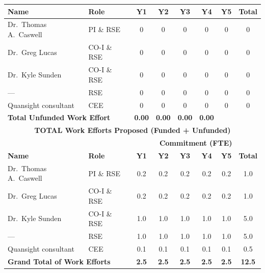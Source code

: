 \documentclass[12pt]{article}
\numberwithin{page}{section}
\begin{document}
\begin{tabular}{|l|l|c|c|c|c|c|c|}
  \cellcolor{gray!30}\textbf{Name }& \cellcolor{gray!30}\textbf{Role} & \cellcolor{gray!30}\textbf{Y1} & \cellcolor{gray!30}\textbf{Y2} & \cellcolor{gray!30}\textbf{Y3}& \cellcolor{gray!30}\textbf{Y4}& \cellcolor{gray!30}\textbf{Y5} & \cellcolor{gray!30}\textbf{Total}     \\  \hline
  Dr.\ Thomas A.\ Caswell & PI \& RSE   & 0 & 0 & 0 & 0 & 0 & 0 \\  \hline
  Dr.\ Greg Lucas         & CO-I \& RSE & 0 & 0 & 0 & 0 & 0 & 0 \\  \hline
  Dr.\ Kyle Sunden        & CO-I \& RSE & 0 & 0 & 0 & 0 & 0 & 0 \\  \hline
  ---                     & RSE         & 0 & 0 & 0 & 0 & 0 & 0 \\  \hline
  Quansight consultant    & CEE         & 0 & 0 & 0 & 0 & 0 & 0 \\  \hline
  \multicolumn{2}{|l|}{\textbf{Total Unfunded Work Effort}} & \textbf{0.00} & \textbf{0.00} & \textbf{0.00}& \textbf{0.00}\\\hline
  \multicolumn{8}{|c|}{\cellcolor{gray!30}\textbf{TOTAL Work Efforts Proposed (Funded + Unfunded)}}\\  \hline
  \cellcolor{gray!30} &  \cellcolor{gray!30}&\multicolumn{6}{c|}{\cellcolor{gray!30}\textbf{Commitment (FTE)}} \\
  \hhline{|*2{>{\arrayrulecolor{gray!30}}-}*4{>{\arrayrulecolor{black}}-}|}
  \cellcolor{gray!30}\textbf{Name }& \cellcolor{gray!30}\textbf{Role} & \cellcolor{gray!30}\textbf{Y1} & \cellcolor{gray!30}\textbf{Y2} & \cellcolor{gray!30}\textbf{Y3}& \cellcolor{gray!30}\textbf{Y4}& \cellcolor{gray!30}\textbf{Y5} & \cellcolor{gray!30}\textbf{Total}     \\  \hline
  Dr.\ Thomas A.\ Caswell & PI \& RSE   & 0.2 & 0.2 & 0.2 & 0.2 & 0.2 & 1.0 \\  \hline
  Dr.\ Greg Lucas         & CO-I \& RSE & 0.2 & 0.2 & 0.2 & 0.2 & 0.2 & 1.0 \\  \hline
  Dr.\ Kyle Sunden        & CO-I \& RSE & 1.0 & 1.0 & 1.0 & 1.0 & 1.0 & 5.0 \\  \hline
  ---                     & RSE         & 1.0 & 1.0 & 1.0 & 1.0 & 1.0 & 5.0 \\  \hline
  Quansight consultant    & CEE         & 0.1 & 0.1 & 0.1 & 0.1 & 0.1 & 0.5 \\  \hline
  \multicolumn{2}{|l|}{\textbf{Grand Total of Work Efforts}} & \textbf{2.5}& \textbf{2.5}& \textbf{2.5}& \textbf{2.5}& \textbf{2.5} &  \textbf{12.5}\\    \hline
\end{tabular}
\end{document}
